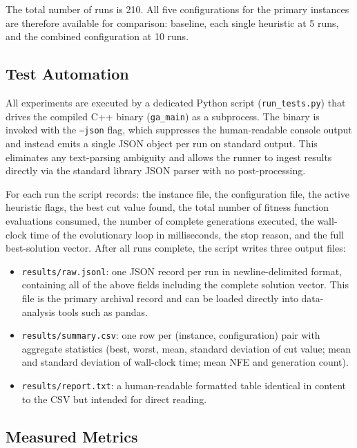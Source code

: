 \documentclass[12pt]{article}
\begin{document}
The total number of runs is 210.
All five configurations for the primary instances are therefore available for
comparison: baseline, each single heuristic at 5 runs, and the combined
configuration at 10 runs.

\subsection{Test Automation}

All experiments are executed by a dedicated Python script (\texttt{run\_tests.py})
that drives the compiled C++ binary (\texttt{ga\_main}) as a subprocess.
The binary is invoked with the \texttt{--json} flag, which suppresses the
human-readable console output and instead emits a single JSON object per run
on standard output.
This eliminates any text-parsing ambiguity and allows the runner to ingest results
directly via the standard library JSON parser with no post-processing.

For each run the script records: the instance file, the configuration file, the
active heuristic flags, the best cut value found, the total number of fitness
function evaluations consumed, the number of complete generations executed, the
wall-clock time of the evolutionary loop in milliseconds, the stop reason, and the
full best-solution vector.
After all runs complete, the script writes three output files:

\begin{itemize}
    \item \texttt{results/raw.jsonl}: one JSON record per run in newline-delimited
          format, containing all of the above fields including the complete
          solution vector.
          This file is the primary archival record and can be loaded directly
          into data-analysis tools such as pandas.
    \item \texttt{results/summary.csv}: one row per (instance, configuration)
          pair with aggregate statistics (best, worst, mean, standard deviation of
          cut value; mean and standard deviation of wall-clock time; mean NFE and
          generation count).
    \item \texttt{results/report.txt}: a human-readable formatted table
          identical in content to the CSV but intended for direct reading.
\end{itemize}

\subsection{Measured Metrics}
\end{document}
